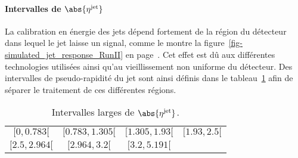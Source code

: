 \paragraph{Intervalles de $\abs{\eta^\text{jet}}$}
La calibration en énergie des jets dépend fortement de la région du détecteur dans lequel le jet laisse un signal, comme le montre la figure~\ref{fig-simulated_jet_response_RunII} en page~\pageref{fig-simulated_jet_response_RunII}.
Cet effet est dû aux différentes technologies utilisées ainsi qu'au vieillissement non uniforme du détecteur.
Des intervalles de pseudo-rapidité du jet sont ainsi définis dans le tableau~\ref{tab-eta_jet_intervalles_large} afin de séparer le traitement de ces différentes régions.
\begin{table}[h]
\centering
\begin{tabular}{cccc}
\toprule
$[\num{0}, \num{0.783}[$ & $[\num{0.783}, \num{1.305}[$ & $[\num{1.305}, \num{1.93}[$ & $[\num{1.93}, \num{2.5}[$ \\
$[\num{2.5}, \num{2.964}[$ & $[\num{2.964}, \num{3.2}[$ & $[\num{3.2}, \num{5.191}[$ &  \\
\bottomrule
\end{tabular}
\caption{Intervalles larges de $\abs{\eta^\text{jet}}$.}
\label{tab-eta_jet_intervalles_large}
\end{table}
